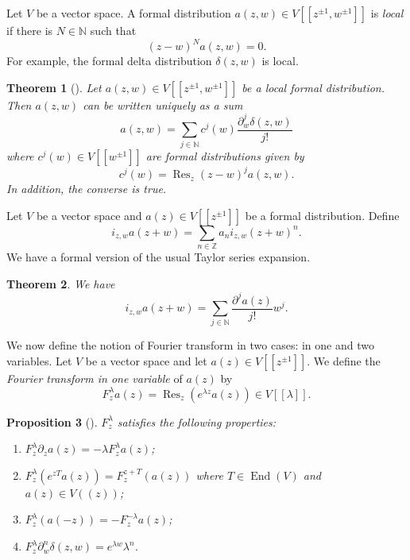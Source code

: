 \documentclass[a4paper, 12pt, reqno]{amsart}
\newtheorem{theorem}{Theorem}[section]
\newtheorem{proposition}[theorem]{Proposition}
\theoremstyle{remark}
\numberwithin{equation}{subsection}
\DeclareMathOperator{\End}{End}
\DeclareMathOperator{\Res}{Res}
\begin{document}
Let $V$ be a vector space.
A formal distribution $a(z, w) \in V[[z^{\pm 1}, w^{\pm 1}]]$ is \emph{local} if there is $N \in \mathbb{N}$ such that
\begin{equation*}
  (z - w)^Na(z, w)=0.
\end{equation*}
For example, the formal delta distribution $\delta(z, w)$ is local.

\begin{theorem}[{\cite[Proposition 2.2]{kac_vertex_1998}}]
  \label{thr:6}
  Let $a(z, w) \in V[[z^{\pm 1}, w^{\pm 1}]]$ be a local formal distribution.
  Then $a(z, w)$ can be written uniquely as a sum
  \begin{equation}
    \label{eq:1}
    a(z, w) = \sum_{j \in \mathbb{N}}c^j(w)\frac{\partial_w^j\delta(z, w)}{j!}
  \end{equation}
  where $c^j(w) \in V[[w^{\pm 1}]]$ are formal distributions given by
  \begin{equation}
    \label{eq:2}
    c^j(w) = \Res_z(z - w)^ja(z, w).
  \end{equation}
  In addition, the converse is true.
\end{theorem}

Let $V$ be a vector space and  $a(z) \in V[[z^{\pm 1}]]$ be a formal distribution.
Define
\begin{equation*}
  i_{z, w}a(z + w) = \sum_{n \in \mathbb{Z}} a_ni_{z, w}(z + w)^n.
\end{equation*}
We have a formal version of the usual Taylor series expansion.

\begin{theorem}
  \label{thr:7}
  We have
  \begin{equation*}
    i_{z, w}a(z + w) = \sum_{j \in \mathbb{N}}\frac{\partial^ja(z)}{j!}w^j.
  \end{equation*}
\end{theorem}

We now define the notion of Fourier transform in two cases: in one and two variables. Let $V$ be a vector space and let $a(z) \in V[[z^{\pm 1}]]$.
We define the \emph{Fourier transform in one variable} of $a(z)$ by
\begin{equation*}
  F^\lambda_za(z) = \Res_z(e^{\lambda z}a(z)) \in V[[\lambda]].
\end{equation*}

\begin{proposition}[{\cite[Proposition 1.5.2]{nozaradan_introduction_2008}}]
  \label{prp:1}
  $F^\lambda_z$ satisfies the following properties:
  \begin{enumerate}
  \item $F^\lambda_z\partial_za(z) = -\lambda F^\lambda_za(z)$;
  \item $F^\lambda_z(e^{zT}a(z)) = F^{z + T}_z(a(z))$ where $T \in \End(V)$ and $a(z) \in V((z))$;
  \item $F^\lambda_z(a(-z)) = -F^{-\lambda}_za(z)$;
  \item $F^\lambda_z\partial^n_w\delta(z, w) = e^{\lambda w}\lambda^n$.
  \end{enumerate}
\end{proposition}
\end{document}
